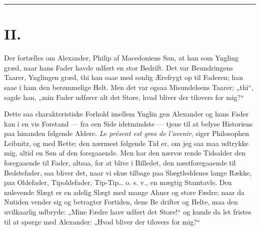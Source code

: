 \documentclass[12pt]{book}
\newcommand{\opage}[1]{\marginnote{\footnotesize\textit{[#1]}}}
\begin{document}
\begin{center}\rule{3cm}{0.4pt}\end{center}

\chapter*{II.}
\label{ch:ii}
\opage{17}\setcounter{footnote}{0}%
Der fortælles om Alexander, Philip af Macedoniens
Søn, at han som Yngling græd, naar hans Fader havde
udført en stor Bedrift. Det var Beundringens Taarer,
Ynglingen græd, thi han saae med sønlig Ærefrygt op
til Faderen; han saae i ham den berømmelige Helt.
Men det var ogsaa Misundelsens Taarer; „thi“, sagde
han, „min Fader udfører alt det Store, hvad bliver der
tilovers for mig?“

Dette saa charakteristiske Forhold imellem Ynglin\-%
gen Alexander og hans Fader kan i en vis Forstand ---
fra een Side idetmindste --- tjene til at belyse Historiens
paa hinanden følgende Aldere. \textit{Le présent est gros de
l'avenir}, siger Philosophen Leibnitz, og med Rette; den
nærmest følgende Tid er, om jeg saa maa udtrykke mig,
altid en Søn af den foregaaende. Men har den nærvæ\-%
rende Tidsalder den foregaaende til Fader, altsaa, for at
blive i Billedet, den næstforegaaende til Bedstefader, saa
bliver det, naar vi skue tilbage paa Slægtleddenes
lange Række, paa Oldefader, Tipoldefader, Tip-Tip\ldots{}
o. s. v., en mægtig Stamtavle. Den nulevende Slægt er
en adelig Slægt med mange Ahner og store Fædre; naar
da Nutiden vender sig og betragter Fortiden, dens Be\-%
drifter og Helte, maa den uvilkaarlig udbryde: „Mine
\opage{18}\setcounter{footnote}{0}%
Fædre have udført det Store!“ og kunde da let fristes til
at spørge med Alexander: „Hvad bliver der tilovers
for mig?“
\end{document}
